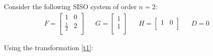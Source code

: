\begin{exa}{Consider the following SISO system of order $n=2$:}
\begin{align*}
    F = \begin{bmatrix}
        1 & 0\\
        \frac{1}{2} & 2\\
    \end{bmatrix}
    &&
    G = \begin{bmatrix}
        1\\
        1\\
    \end{bmatrix}
    &&
    H = \begin{bmatrix}
        1 & 0\\
    \end{bmatrix}
    &&
    D = 0
\end{align*}

Using the transformation \ref{t1}:
\vspace{-10pt}


\end{exa}
